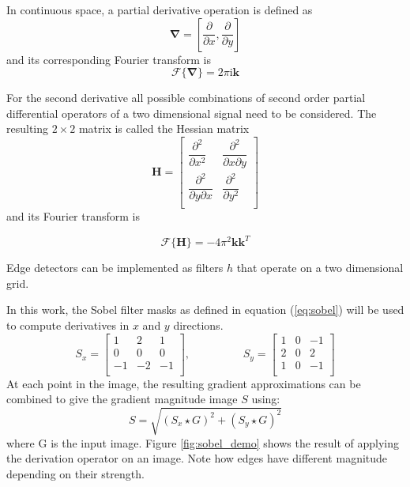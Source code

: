 		In continuous space, a partial derivative operation is defined as
		\begin{equation}
		 	\mathbf{\nabla} = \left[ \dfrac{\partial}{\partial x}, \dfrac{\partial}{\partial y} \right]
		\end{equation}
		and its corresponding Fourier transform is
		\begin{equation}
			\mathscr{F}\{\mathbf{\nabla}\} = 2 \pi \text{i} \mathbf{k}
		\end{equation}
		
		For the second derivative all possible combinations of second order partial differential operators of a two dimensional signal need to be considered. The resulting $2 \times 2$ matrix is called the Hessian matrix
		\begin{equation}
			\mathbf{H} = 
				\begin{bmatrix}
   \dfrac{\partial^2}{\partial x^2}       & \dfrac{\partial^2}{\partial x \partial y}\\
   \dfrac{\partial^2}{\partial y \partial x}       & \dfrac{\partial^2}{\partial y^2}\\
				\end{bmatrix}
				\label{eq:hessian_def}
		\end{equation}
		and its Fourier transform is
		
		\begin{equation}
			\mathscr{F}\{\mathbf{H}\} = -4 \pi^2 \mathbf{k}\mathbf{k}^T
		\end{equation}
		
		
		Edge detectors can be implemented as filters $h$ that operate on a two dimensional grid. 

			
		In this work, the Sobel filter masks as defined in equation (\ref{eq:sobel}) will be used to compute derivatives in $x$ and $y$ directions. 
		\begin{equation}
			S_x =
			 \begin{bmatrix}
     				1	& 2 & 1 \\
    					0	 & 0 & 0 \\
    					-1	 & -2 & -1 \\
				\end{bmatrix},
			\hspace{2cm}
			S_y = 
				\begin{bmatrix}
     				1	& 0 & -1 \\
    					2	 & 0 & 2 \\
    					1	 & 0 & -1 \\
				\end{bmatrix}
			\label{eq:sobel}
			\end{equation}
		At each point in the image, the resulting gradient approximations can be combined to give the gradient magnitude image $S$ using:
		\begin{equation}
			S = \sqrt{(S_x \star G )^2 + (S_y \star G)^2}
			\label{eq:grad_sobel}
		\end{equation}
		where G is the input image. Figure \ref{fig:sobel_demo} shows the result of applying the derivation operator on an image. Note how edges have different magnitude depending on their strength. 
		
